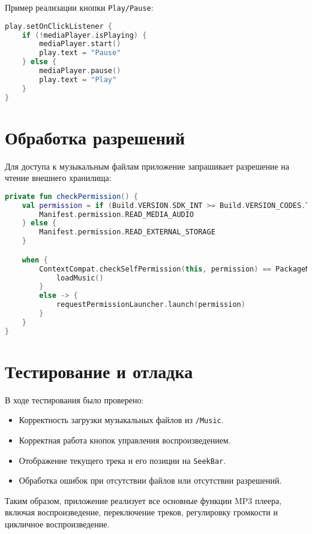 Пример реализации кнопки \texttt{Play/Pause}:

\begin{lstlisting}[language=Kotlin, caption={Обработка нажатия кнопки Play/Pause}]
play.setOnClickListener {
    if (!mediaPlayer.isPlaying) {
        mediaPlayer.start()
        play.text = "Pause"
    } else {
        mediaPlayer.pause()
        play.text = "Play"
    }
}
\end{lstlisting}

\section{Обработка разрешений}

Для доступа к музыкальным файлам приложение запрашивает разрешение на чтение внешнего хранилища:

\begin{lstlisting}[language=Kotlin, caption={Проверка разрешений}]
private fun checkPermission() {
    val permission = if (Build.VERSION.SDK_INT >= Build.VERSION_CODES.TIRAMISU) {
        Manifest.permission.READ_MEDIA_AUDIO
    } else {
        Manifest.permission.READ_EXTERNAL_STORAGE
    }

    when {
        ContextCompat.checkSelfPermission(this, permission) == PackageManager.PERMISSION_GRANTED -> {
            loadMusic()
        }
        else -> {
            requestPermissionLauncher.launch(permission)
        }
    }
}
\end{lstlisting}

\section{Тестирование и отладка}

В ходе тестирования было проверено:

\begin{itemize}
\item Корректность загрузки музыкальных файлов из \texttt{/Music}.
\item Корректная работа кнопок управления воспроизведением.
\item Отображение текущего трека и его позиции на \texttt{SeekBar}.
\item Обработка ошибок при отсутствии файлов или отсутствии разрешений.
\end{itemize}

Таким образом, приложение реализует все основные функции MP3 плеера, включая воспроизведение, переключение треков, регулировку громкости и цикличное воспроизведение.
